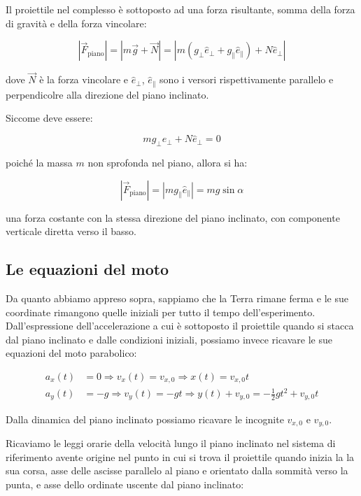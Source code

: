 \documentclass{article}
\begin{document}
Il proiettile nel complesso è sottoposto ad una forza risultante, somma
della forza di gravità e della forza vincolare: 

\begin{equation}
|\vec{F}_\text{piano}| = |m\vec{g} + \vec{N}| = |m(g_\perp\hat{e}_\perp + g_\parallel\hat{e}_\parallel) + N\hat{e}_\perp|   
\end{equation}

dove $\vec{N}$ è la forza vincolare e $\hat{e}_\perp$, $\hat{e}_\parallel$
sono i versori rispettivamente parallelo e perpendicolre alla direzione del
piano inclinato.

Siccome deve essere:

\begin{equation}
mg_\perp\hat{e}_\perp + N\hat{e}_\perp = 0
\end{equation}

poiché la massa $m$ non sprofonda nel piano, allora si ha:

\begin{equation}
|\vec{F}_\text{piano}| =  |mg_\parallel\hat{e}_\parallel| = mg \sin\alpha
\end{equation}

una forza costante con la stessa direzione del piano inclinato,
con componente verticale diretta verso il basso.

\subsection{Le equazioni del moto}
Da quanto abbiamo appreso sopra, sappiamo che la Terra rimane ferma
e le sue coordinate rimangono quelle iniziali per tutto il tempo
dell'esperimento.
Dall'espressione dell'accelerazione a cui è sottoposto il proiettile
quando si stacca dal piano inclinato e dalle condizioni iniziali,
possiamo invece ricavare le sue equazioni del moto parabolico:

\begin{align}
a_x(t) &= 0 \Rightarrow v_x(t) = v_{x,0} \Rightarrow x(t) = v_{x,0}t \\
a_y(t) &= -g \Rightarrow v_y(t) = - g t \Rightarrow y(t) + v_{y,0} = - \frac{1}{2} g t^2 + v_{y,0} t  
\end{align}

Dalla dinamica del piano inclinato possiamo ricavare le incognite $v_{x,0}$ e $v_{y,0}$.

Ricaviamo le leggi orarie della velocità lungo il piano inclinato nel sistema di riferimento
avente origine nel punto in cui si trova il proiettile quando inizia la la sua corsa, asse delle
ascisse parallelo al piano e orientato dalla sommità verso la punta, e asse dello ordinate uscente
dal piano inclinato:
\end{document}
